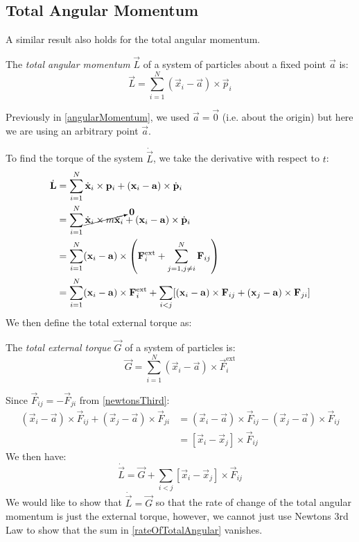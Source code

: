 \documentclass[../main.tex]{subfiles}
\begin{document}
\subsection{Total Angular Momentum}
\label{totalAngularMomentum}
A similar result also holds for the total angular momentum.
\begin{definition}
  The \textit{total angular momentum} $\vec{L}$ of a system of particles about a fixed point $\vec{a}$ is:
  \[
    \vec{L} = \sum_{i = 1}^{N} (\vec{x}_i - \vec{a})\times \vec{p}_i
  \]
\end{definition}
\begin{remark}
  Previously in \cref{angularMomentum}, we used $\vec{a} = \vec{0}$ (i.e. about the origin) but here we are using an arbitrary point $\vec{a}$.
\end{remark}
To find the torque of the system $\dot{\vec{L}}$, we take the derivative with respect to $t$:
\begin{align*}
  \dot{\vec{L}} &= \sum_{i = 1}^{N} \dot{\vec{x}}_i \times \vec{p}_i + (\vec{x}_i - \vec{a}) \times \dot{\vec{p}}_i \\
                &= \sum_{i = 1}^{N} \cancelto{\vec{0}}{\dot{\vec{x}}_i \times m \dot{\vec{x}}_i} + (\vec{x}_i - \vec{a}) \times \dot{\vec{p}}_i \\
                &= \sum_{i = 1}^{N} (\vec{x}_i - \vec{a}) \times \left(\vec{F}^{\text{ext}}_i + \sum_{j = 1, j\neq i}^N \vec{F}_{i j}\right) \\
                &= \sum_{i = 1}^{N} (\vec{x}_i - \vec{a}) \times \vec{F}^{\text{ext}}_i + \sum_{i < j} [(\vec{x}_i - \vec{a}) \times \vec{F}_{i j} + (\vec{x}_j - \vec{a}) \times \vec{F}_{j i}]
\end{align*}
We then define the total external torque as:
\begin{definition}
  The \textit{total external torque} $\vec{G}$ of a system of particles is:
  \[
    \vec{G} = \sum_{i = 1}^{N} (\vec{x}_i - \vec{a}) \times \vec{F}^{\text{ext}}_i
  \]
\end{definition}
Since $\vec{F}_{i j} = -\vec{F}_{j i}$ from \cref{newtonsThird}:
\begin{align*}
  (\vec{x}_i - \vec{a}) \times \vec{F}_{i j} + (\vec{x}_j - \vec{a}) \times \vec{F}_{j i} &= (\vec{x}_i - \vec{a}) \times \vec{F}_{i j} - (\vec{x}_j - \vec{a}) \times \vec{F}_{i j} \\
                                                                                          &= [\vec{x}_i - \vec{x}_j]\times\vec{F}_{i j}
\end{align*}
We then have:
\begin{equation}
  \dot{\vec{L}} = \vec{G} + \sum_{i < j} [\vec{x}_i - \vec{x}_j]\times\vec{F}_{i j} \label{rateOfTotalAngular}
\end{equation}
We would like to show that $\dot{\vec{L}} = \vec{G}$ so that the rate of change of the total angular momentum is just the external torque, however, we cannot just use Newtons 3rd Law to show that the sum in \cref{rateOfTotalAngular} vanishes.
\end{document}
